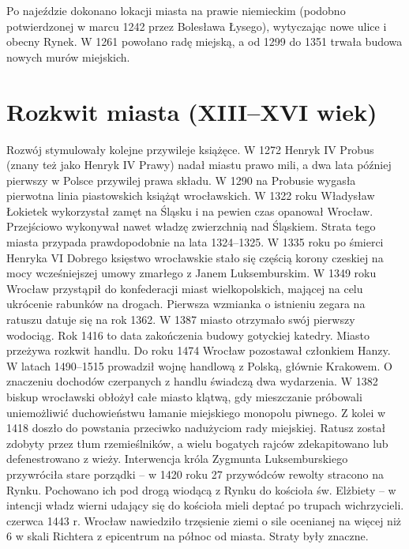 \documentclass{article}
\begin{document}
\bigskip
\newline
Po najeździe dokonano lokacji miasta na prawie niemieckim (podobno potwierdzonej w marcu 1242 przez Bolesława Łysego), wytyczając nowe ulice i obecny Rynek. W 1261 powołano radę miejską, a od 1299 do 1351 trwała budowa nowych murów miejskich.

\section{Rozkwit miasta (XIII–XVI wiek)}
Rozwój stymulowały kolejne przywileje książęce. W 1272 Henryk IV Probus (znany też jako Henryk IV Prawy) nadał miastu prawo mili, a dwa lata później pierwszy w Polsce przywilej prawa składu. W 1290 na Probusie wygasła pierwotna linia piastowskich książąt wrocławskich. W 1322 roku Władysław Łokietek wykorzystał zamęt na Śląsku i na pewien czas opanował Wrocław. Przejściowo wykonywał nawet władzę zwierzchnią nad Śląskiem. Strata tego miasta przypada prawdopodobnie na lata 1324–1325. W 1335 roku po śmierci Henryka VI Dobrego księstwo wrocławskie stało się częścią korony czeskiej na mocy wcześniejszej umowy zmarłego z Janem Luksemburskim.
\bigskip
\newline
W 1349 roku Wrocław przystąpił do konfederacji miast wielkopolskich, mającej na celu ukrócenie rabunków na drogach.
\bigskip
\newline
Pierwsza wzmianka o istnieniu zegara na ratuszu datuje się na rok 1362. W 1387 miasto otrzymało swój pierwszy wodociąg. Rok 1416 to data zakończenia budowy gotyckiej katedry. Miasto przeżywa rozkwit handlu. Do roku 1474 Wrocław pozostawał członkiem Hanzy. W latach 1490–1515 prowadził wojnę handlową z Polską, głównie Krakowem.
\bigskip
\newline
O znaczeniu dochodów czerpanych z handlu świadczą dwa wydarzenia. W 1382 biskup wrocławski obłożył całe miasto klątwą, gdy mieszczanie próbowali uniemożliwić duchowieństwu łamanie miejskiego monopolu piwnego. Z kolei w 1418 doszło do powstania przeciwko nadużyciom rady miejskiej. Ratusz został zdobyty przez tłum rzemieślników, a wielu bogatych rajców zdekapitowano lub defenestrowano z wieży. Interwencja króla Zygmunta Luksemburskiego przywróciła stare porządki – w 1420 roku 27 przywódców rewolty stracono na Rynku. Pochowano ich pod drogą wiodącą z Rynku do kościoła św. Elżbiety – w intencji władz wierni udający się do kościoła mieli deptać po trupach wichrzycieli.
\bigskip
{} czerwca 1443 r. Wrocław nawiedziło trzęsienie ziemi o sile ocenianej na więcej niż 6 w skali Richtera z epicentrum na północ od miasta. Straty były znaczne.
\end{document}
